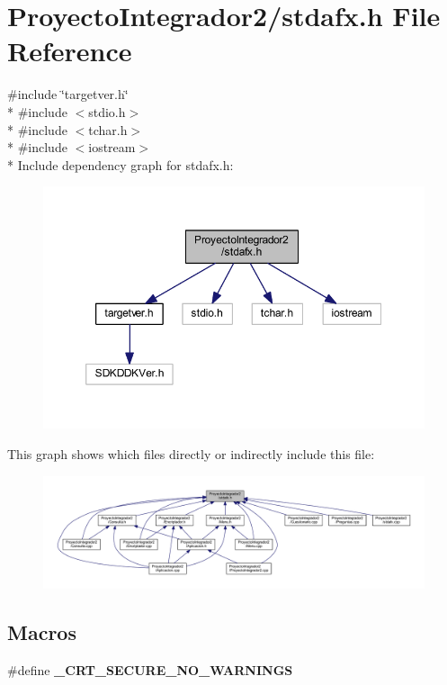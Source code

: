 \section{Proyecto\-Integrador2/stdafx.h File Reference}
\label{stdafx_8h}
{\ttfamily \#include \char`\"{}targetver.\-h\char`\"{}}\\*
{\ttfamily \#include $<$stdio.\-h$>$}\\*
{\ttfamily \#include $<$tchar.\-h$>$}\\*
{\ttfamily \#include $<$iostream$>$}\\*
Include dependency graph for stdafx.\-h\-:\nopagebreak
\begin{figure}[H]
\begin{center}
\leavevmode
\includegraphics[width=350pt]{stdafx_8h__incl}
\end{center}
\end{figure}
This graph shows which files directly or indirectly include this file\-:\nopagebreak
\begin{figure}[H]
\begin{center}
\leavevmode
\includegraphics[width=350pt]{stdafx_8h__dep__incl}
\end{center}
\end{figure}
\subsection*{Macros}
\begin{DoxyCompactItemize}
\item 
\#define {\bf \-\_\-\-C\-R\-T\-\_\-\-S\-E\-C\-U\-R\-E\-\_\-\-N\-O\-\_\-\-W\-A\-R\-N\-I\-N\-G\-S}
\end{DoxyCompactItemize}


